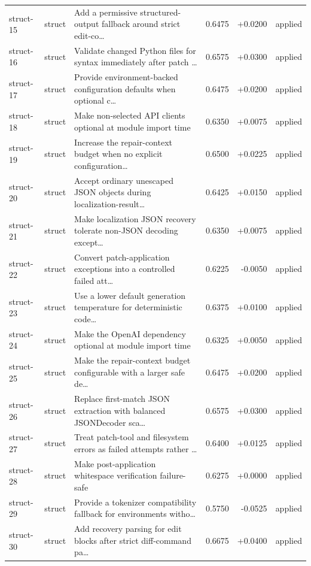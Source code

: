 \begin{center}
\begin{longtable}{llp{5.2cm}rrl}
struct-15 & struct & Add a permissive structured-output fallback around strict edit-co\ldots{} & 0.6475 & +0.0200 & applied \\
struct-16 & struct & Validate changed Python files for syntax immediately after patch \ldots{} & 0.6575 & +0.0300 & applied \\
struct-17 & struct & Provide environment-backed configuration defaults when optional c\ldots{} & 0.6475 & +0.0200 & applied \\
struct-18 & struct & Make non-selected API clients optional at module import time & 0.6350 & +0.0075 & applied \\
struct-19 & struct & Increase the repair-context budget when no explicit configuration\ldots{} & 0.6500 & +0.0225 & applied \\
struct-20 & struct & Accept ordinary unescaped JSON objects during localization-result\ldots{} & 0.6425 & +0.0150 & applied \\
struct-21 & struct & Make localization JSON recovery tolerate non-JSON decoding except\ldots{} & 0.6350 & +0.0075 & applied \\
struct-22 & struct & Convert patch-application exceptions into a controlled failed att\ldots{} & 0.6225 & -0.0050 & applied \\
struct-23 & struct & Use a lower default generation temperature for deterministic code\ldots{} & 0.6375 & +0.0100 & applied \\
struct-24 & struct & Make the OpenAI dependency optional at module import time & 0.6325 & +0.0050 & applied \\
struct-25 & struct & Make the repair-context budget configurable with a larger safe de\ldots{} & 0.6475 & +0.0200 & applied \\
struct-26 & struct & Replace first-match JSON extraction with balanced JSONDecoder sca\ldots{} & 0.6575 & +0.0300 & applied \\
struct-27 & struct & Treat patch-tool and filesystem errors as failed attempts rather \ldots{} & 0.6400 & +0.0125 & applied \\
struct-28 & struct & Make post-application whitespace verification failure-safe & 0.6275 & +0.0000 & applied \\
struct-29 & struct & Provide a tokenizer compatibility fallback for environments witho\ldots{} & 0.5750 & -0.0525 & applied \\
struct-30 & struct & Add recovery parsing for edit blocks after strict diff-command pa\ldots{} & 0.6675 & +0.0400 & applied \\

\end{longtable}
\end{center}
